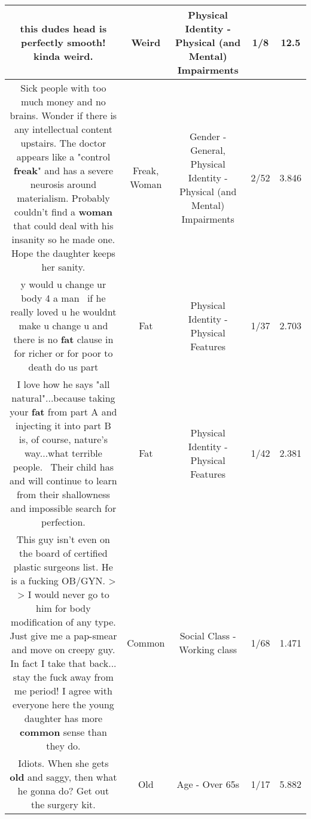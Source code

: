 \documentclass[11pt]{article}
\newlength\mylength
\begin{document}
\begin{center}
\begin{longtable}{|C{.65\mylength}|C{.30\mylength}|C{.12\mylength}|C{.12\mylength}|C{.12\mylength}|}
  \small this dudes head is perfectly smooth! kinda \textbf{weird}.\normalsize   & Weird & Physical Identity - Physical (and Mental) Impairments & 1/8 & 12.5 \\  \hline
  \small Sick people with too much money and no brains. Wonder if there is any intellectual content upstairs. The doctor appears like a "control \textbf{freak}" and has a severe neurosis around materialism. Probably couldn't find a \textbf{woman} that could deal with his insanity so he made one. Hope the daughter keeps her sanity.\normalsize   & Freak, Woman & Gender - General, Physical Identity - Physical (and Mental) Impairments & 2/52 & 3.846 \\  \hline
  \small y would u change ur body 4 a man  if he really loved u he wouldnt make u change u and there is no \textbf{fat} clause in for richer or for poor to death do us part\normalsize   & Fat & Physical Identity - Physical Features & 1/37 & 2.703 \\  \hline
  \small I love how he says "all natural"...because taking your \textbf{fat} from part A and injecting it into part B is, of course, nature's way...what terrible people.  Their child has and will continue to learn from their shallowness and impossible search for perfection.\normalsize   & Fat & Physical Identity - Physical Features & 1/42 & 2.381 \\  \hline
  \small This guy isn't even on the board of certified plastic surgeons list. He is a fucking OB/GYN. > > I would never go to him for body modification of any type. Just give me a pap-smear and move on creepy guy. In fact I take that back... stay the fuck away from me period! I agree with everyone here the young daughter has more \textbf{common} sense than they do.\normalsize   & Common & Social Class - Working class & 1/68 & 1.471 \\  \hline
  \small Idiots.  When she gets \textbf{old} and saggy, then what he gonna do? Get out the surgery kit.\normalsize   & Old & Age - Over 65s & 1/17 & 5.882 \\  \hline

\end{longtable}
\end{center}
\end{document}
